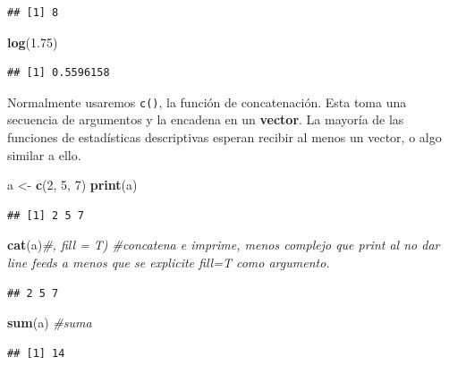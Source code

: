 \documentclass[
]{article}
\newenvironment{Shaded}{\begin{snugshade}}{\end{snugshade}}
\newcommand{\CommentTok}[1]{\textcolor[rgb]{0.56,0.35,0.01}{\textit{#1}}}
\newcommand{\DecValTok}[1]{\textcolor[rgb]{0.00,0.00,0.81}{#1}}
\newcommand{\FloatTok}[1]{\textcolor[rgb]{0.00,0.00,0.81}{#1}}
\newcommand{\FunctionTok}[1]{\textcolor[rgb]{0.13,0.29,0.53}{\textbf{#1}}}
\newcommand{\NormalTok}[1]{#1}
\newcommand{\OtherTok}[1]{\textcolor[rgb]{0.56,0.35,0.01}{#1}}
\begin{document}
\begin{verbatim}
## [1] 8
\end{verbatim}

\begin{Shaded}
\begin{Highlighting}[]
\FunctionTok{log}\NormalTok{(}\FloatTok{1.75}\NormalTok{)}
\end{Highlighting}
\end{Shaded}

\begin{verbatim}
## [1] 0.5596158
\end{verbatim}

Normalmente usaremos \texttt{c()}, la función de concatenación. Esta
toma una secuencia de argumentos y la encadena en un \textbf{vector}. La
mayoría de las funciones de estadísticas descriptivas esperan recibir al
menos un vector, o algo similar a ello.

\begin{Shaded}
\begin{Highlighting}[]
\NormalTok{a }\OtherTok{\textless{}{-}} \FunctionTok{c}\NormalTok{(}\DecValTok{2}\NormalTok{, }\DecValTok{5}\NormalTok{, }\DecValTok{7}\NormalTok{)}
\FunctionTok{print}\NormalTok{(a)}
\end{Highlighting}
\end{Shaded}

\begin{verbatim}
## [1] 2 5 7
\end{verbatim}

\begin{Shaded}
\begin{Highlighting}[]
\FunctionTok{cat}\NormalTok{(a)}\CommentTok{\#, fill = T) \#concatena e imprime, menos complejo que print al no dar line feeds a menos que se explicite fill=T como argumento.}
\end{Highlighting}
\end{Shaded}

\begin{verbatim}
## 2 5 7
\end{verbatim}

\begin{Shaded}
\begin{Highlighting}[]
\FunctionTok{sum}\NormalTok{(a) }\CommentTok{\#suma}
\end{Highlighting}
\end{Shaded}

\begin{verbatim}
## [1] 14
\end{verbatim}
\end{document}
